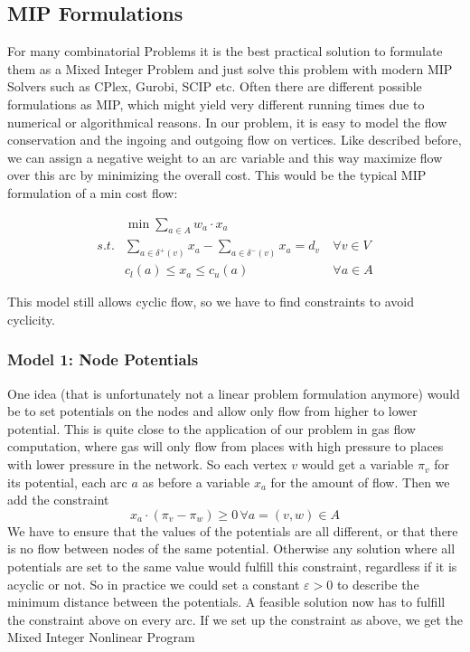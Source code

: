 


\subsection{MIP Formulations}
For many combinatorial Problems it is the best practical solution to formulate them as a Mixed Integer Problem and just 
solve this problem with modern MIP Solvers such as CPlex, Gurobi, SCIP etc. Often there are different possible 
formulations as 
MIP, which might yield very different running times due to numerical or algorithmical reasons. In our problem, it is 
easy to model the flow conservation and the ingoing and outgoing flow on vertices. Like described before, we can assign 
a negative weight to an arc variable and this way maximize flow over this arc by minimizing the overall cost. This 
would be the typical MIP formulation of a min cost flow:

\begin{align*}
  &\min \sum_{a\in A} w_a\cdot x_a  \\
 s.t. & \sum_{a\in \delta^+(v)}x_a - \sum_{a\in\delta^- (v)}x_a = d_v\ &\forall v\in V \\
  & c_l(a)\le x_a \le c_u(a) & \forall a\in A
\end{align*}

This model still allows cyclic flow, so we have to find constraints to avoid cyclicity. 
\subsubsection{Model 1: Node Potentials}

One idea (that is unfortunately not a linear problem formulation anymore) would be to set potentials on the nodes and 
allow only flow from higher to lower potential. This is quite close to the application of our problem in gas flow 
computation, where gas will only flow from places with high pressure to places with lower pressure in the network. So 
each vertex $v$ would get a variable $\pi_v$ for its potential, each arc $a$ as before a variable $x_a$ for the amount 
of flow. Then we add the constraint $$x_a\cdot (\pi_v -\pi_w)\ge 0\,\forall a=(v,w)\in A $$
We have to ensure that the values of the potentials are all 
different, or that there is no flow between nodes of the same potential. Otherwise any solution where all potentials 
are set to the same value would fulfill this constraint, regardless if it is acyclic or not. So in practice we could 
set a constant $\varepsilon > 0$ to describe the minimum distance between the potentials. A feasible 
solution now has to fulfill the constraint above on every arc. If we set up the constraint as above, we get the Mixed 
Integer Nonlinear Program

